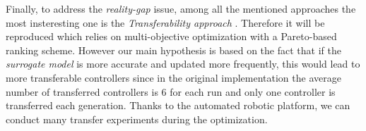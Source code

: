 Finally, to address the \emph{reality-gap} issue, among all the mentioned approaches the most insteresting one is the \emph{Transferability approach} \citep{koos2012transferability}. Therefore it will be reproduced which relies on multi-objective optimization with a Pareto-based ranking scheme. However our main hypothesis is based on the fact that if the \textit{surrogate model} is more accurate and updated more frequently, this would lead to more transferable controllers since in the original implementation the average number of transferred controllers is 6 for each run and only one controller is transferred each generation. Thanks to the automated robotic platform, we can conduct many transfer experiments during the optimization.





